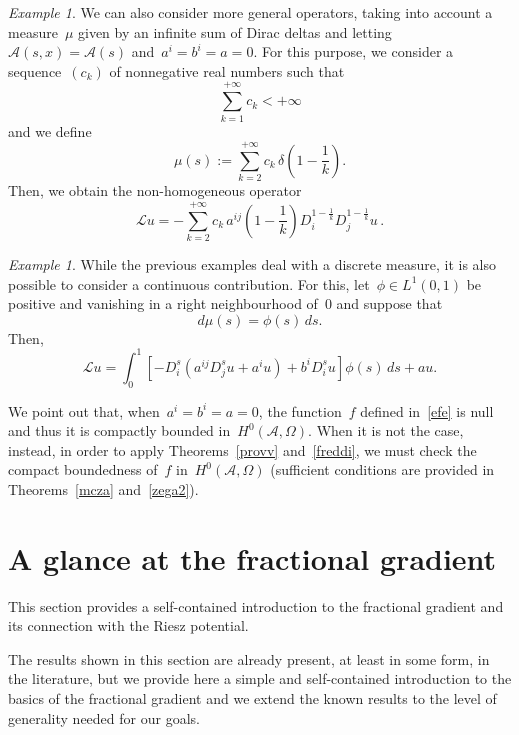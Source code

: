 \documentclass[11pt,hyp,]{nyjm}
\numberwithin{equation}{section}
\theoremstyle{remark}
\newtheorem{example}[theorem]{Example}
\begin{document}
\begin{example}
We can also consider more general operators, taking into account a measure~$\mu$ given by an infinite sum of Dirac deltas and letting~$\mathcal{A}(s,x) = \mathcal{A}(s)$
and~$a^i=b^i=a=0$. For this purpose, we consider a sequence~$(c_k)$ of nonnegative real numbers such that
\[ \sum_{k=1}^{+\infty} c_k < +\infty\]  and we define
\[\mu(s):= \sum_{k=2}^{+\infty} c_k\,\delta\left(1 - \frac{1}{k}\right) . \]
Then, we obtain the non-homogeneous operator
\[ \mathcal{L}u= -\sum_{k=2}^{+\infty} c_k \,  a^{ij} \left(1 - \frac{1}{k}\right) D_i^{1 - \frac{1}{k}} D_j^{1 - \frac{1}{k}}u \,. \]\end{example}

\begin{example}
While the previous examples deal with a discrete measure, it is also possible to consider a continuous contribution. For this, let~$\phi \in L^1(0,1)$ be positive and vanishing in a right neighbourhood of~$0$ and suppose that
\[ d\mu(s) = \phi(s)\,ds.\]
Then,
\[ \mathcal{L} u = \int_0^1  \left[ - D^s_i \left(a^{ij} D^s_j u + a^i u \right) + b^i D^s_i u \right] \phi(s) \, ds+ a u.\]

We point out that, when~$a^i=b^i=a=0$, the function~$f$ defined in~\eqref{efe} is null and thus it is compactly bounded in~$H^0(\mathcal{A}, \Omega)$. When it is not the case, instead, in order to apply Theorems~\ref{provv} and~\ref{freddi}, we must check the compact boundedness of~$f$ in~$H^0(\mathcal{A}, \Omega)$ (sufficient conditions are provided in Theorems~\ref{mcza} and~\ref{zega2}).  \end{example}

\section{A glance at the fractional gradient}\label{prelimin}

This section provides a self-contained introduction to the fractional gradient and its
connection with the Riesz potential. 

The results shown in this section are already present, at least in some form, in the literature,
but we provide here a simple and self-contained introduction to the basics of the fractional gradient and we extend the known results to the level of generality needed for our goals.
		
\end{document}
